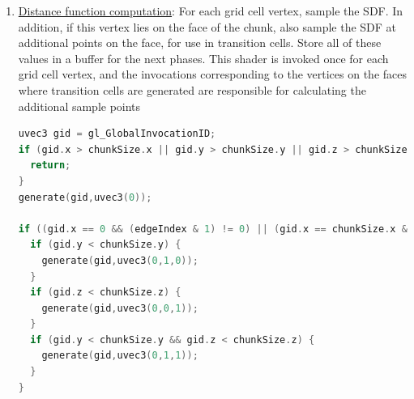 \documentclass{article}
\begin{document}
\begin{enumerate}
\item \underline{Distance function computation}: For each grid cell vertex, sample the SDF. In addition, if this vertex lies on the face of the chunk, also sample the SDF at additional points on the face, for use in transition cells. Store all of these values in a buffer for the next phases. This shader is invoked once for each grid cell vertex, and the invocations corresponding to the vertices on the faces where transition cells are generated are responsible for calculating the additional sample points

\begin{lstlisting}[language=C++,label={tv_generate},caption={Part of the GLSL code responsible for sampling the SDF in the parallel Transvoxel algorithm. This code snippet samples the SDF at the actual grid point, as well as at points surrounding it on the -X and +X facing faces. Lines 7-17 are repeated for the remaining faces of the chunk. Figure \ref{fig:tv_gen_grid} demonstrates which sample points would be calculated in various invocations of this algorithm. The \texttt{generate} function takes 2 parameters: the first is the actual position of the grid cell vertex, and the second is an offset parameter, for generating sample values halfway beetween grid vertices. For example, a value of \texttt{uvec3(0,1,0)} corresponds to a point that is offset from the position in the first argument by half a grid cell in the Y direction.}]
uvec3 gid = gl_GlobalInvocationID;
if (gid.x > chunkSize.x || gid.y > chunkSize.y || gid.z > chunkSize.z) {
  return;
}
generate(gid,uvec3(0));

if ((gid.x == 0 && (edgeIndex & 1) != 0) || (gid.x == chunkSize.x && (edgeIndex & 2) != 0)) {
  if (gid.y < chunkSize.y) {
    generate(gid,uvec3(0,1,0));
  }
  if (gid.z < chunkSize.z) {
    generate(gid,uvec3(0,0,1));
  }
  if (gid.y < chunkSize.y && gid.z < chunkSize.z) {
    generate(gid,uvec3(0,1,1));
  }
}
\end{lstlisting}


\end{enumerate}
\end{document}
